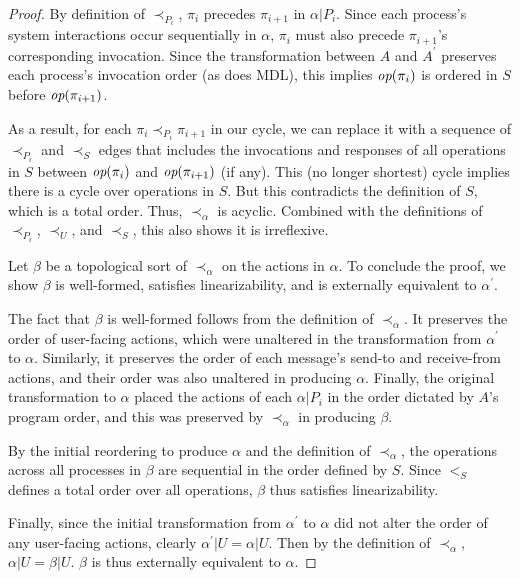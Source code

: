 \begin{proof}
By definition of $\prec_{P_i}$, $\pi_i$ precedes $\pi_{i+1}$ in $\alpha | P_i$.
Since each process’s system interactions occur sequentially in $\alpha$,
$\pi_{i}$ must also precede $\pi_{i+1}$'s corresponding invocation.
Since the transformation between $A$ and $A^\prime$ preserves each process’s
invocation order (as does MDL), this implies $\operatorname*{\textit{op}}(\pi_{i})$ is ordered in $S$
before $\operatorname*{\textit{op}}(\pi_{i+1})$.

As a result, for each $\pi_i \prec_{P_i} \pi_{i+1}$ in our cycle, we can replace it
with a sequence of $\prec_{P_i}$ and $\prec_S$ edges that includes the invocations 
and responses of all operations in $S$ between $\operatorname*{\textit{op}}(\pi_i)$ and $\operatorname*{\textit{op}}(\pi_{i+1})$
(if any). This (no longer shortest) cycle implies there is a cycle over operations 
in $S$. But this contradicts the definition of $S$, which is a 
total order. Thus, $\prec_{\alpha}$ is acyclic. Combined with the
definitions of $\prec_{P_i}$, $\prec_U$, and $\prec_S$, this also
shows it is irreflexive.

Let $\beta$ be a topological sort of $\prec_{\alpha}$ on the actions in
$\alpha$. To conclude the proof, we show $\beta$ is well-formed,
satisfies linearizability, and is externally equivalent to $\alpha^\prime$.

The fact that $\beta$ is well-formed follows from the definition of
$\prec_{\alpha}$. It preserves the order of user-facing actions,
which were unaltered in the transformation from $\alpha^\prime$ to $\alpha$.
Similarly, it preserves the order of each message's send-to and receive-from actions,
and their order was also unaltered in producing $\alpha$. Finally, the original
transformation to $\alpha$ placed the actions of each $\alpha | P_i$ in
the order dictated by $A$'s program order, and this was preserved by
$\prec_{\alpha}$ in producing $\beta$.

By the initial reordering to produce $\alpha$ and the definition of
$\prec_{\alpha}$, the operations across all processes in $\beta$
are sequential in the order defined by $S$. Since $<_S$ defines a
total order over all operations, $\beta$ thus satisfies linearizability.

Finally, since the initial transformation from $\alpha^\prime$ to $\alpha$
did not alter the order of any user-facing actions, clearly
$\alpha^\prime | U = \alpha | U$. Then by the definition of $\prec_{\alpha}$, 
$\alpha | U = \beta | U$. $\beta$ is thus externally equivalent to $\alpha$.
\end{proof}
